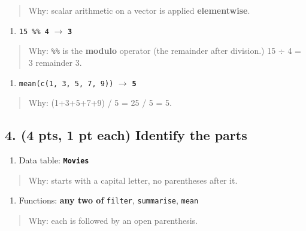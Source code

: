 \documentclass[
  11pt,
  letterpaper,
  DIV=11,
  numbers=noendperiod]{scrartcl}
\begin{document}
\begin{quote}
Why: scalar arithmetic on a vector is applied \textbf{elementwise}.
\end{quote}

\begin{enumerate}
\def\labelenumi{(\alph{enumi})}
\setcounter{enumi}{2}
\item \texttt{15\ \%\%\ 4} $\rightarrow$ \textbf{\texttt{3}}
\end{enumerate}

\begin{quote}
Why: \texttt{\%\%} is the \textbf{modulo} operator (the remainder after division.) 15 $\div$ 4 = 3 remainder 3.
\end{quote}

\begin{enumerate}
\def\labelenumi{(\alph{enumi})}
\setcounter{enumi}{3}
\item \texttt{mean(c(1,\ 3,\ 5,\ 7,\ 9))} $\rightarrow$ \textbf{\texttt{5}}
\end{enumerate}

\begin{quote}
Why: (1+3+5+7+9) / 5 = 25 / 5 = 5.
\end{quote}

\hrulefill

\subsection{4. (4 pts, 1 pt each) Identify the parts}

\begin{enumerate}
\def\labelenumi{(\alph{enumi})}
\item Data table: \textbf{\texttt{Movies}}
\end{enumerate}

\begin{quote}
Why: starts with a capital letter, no parentheses after it.
\end{quote}

\begin{enumerate}
\def\labelenumi{(\alph{enumi})}
\setcounter{enumi}{1}
\item Functions: \textbf{any two of} \texttt{filter}, \texttt{summarise}, \texttt{mean}
\end{enumerate}

\begin{quote}
Why: each is followed by an open parenthesis.
\end{quote}
\end{document}
